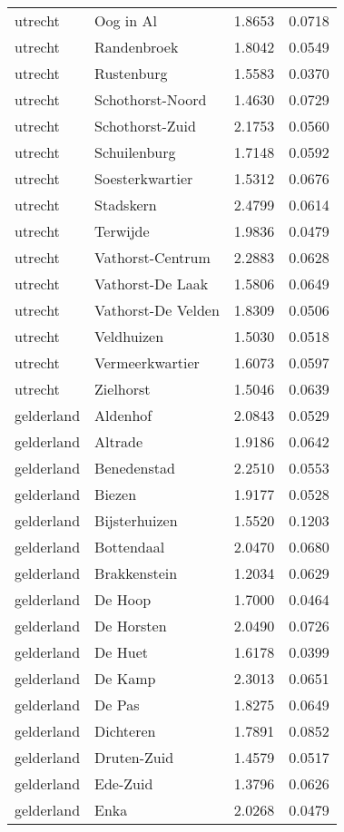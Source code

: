 \begin{longtable}{llcc}
utrecht & Oog in Al & 1.8653 & 0.0718 \\
utrecht & Randenbroek & 1.8042 & 0.0549 \\
utrecht & Rustenburg & 1.5583 & 0.0370 \\
utrecht & Schothorst-Noord & 1.4630 & 0.0729 \\
utrecht & Schothorst-Zuid & 2.1753 & 0.0560 \\
utrecht & Schuilenburg & 1.7148 & 0.0592 \\
utrecht & Soesterkwartier & 1.5312 & 0.0676 \\
utrecht & Stadskern & 2.4799 & 0.0614 \\
utrecht & Terwijde & 1.9836 & 0.0479 \\
utrecht & Vathorst-Centrum & 2.2883 & 0.0628 \\
utrecht & Vathorst-De Laak & 1.5806 & 0.0649 \\
utrecht & Vathorst-De Velden & 1.8309 & 0.0506 \\
utrecht & Veldhuizen & 1.5030 & 0.0518 \\
utrecht & Vermeerkwartier & 1.6073 & 0.0597 \\
utrecht & Zielhorst & 1.5046 & 0.0639 \\
gelderland & Aldenhof & 2.0843 & 0.0529 \\
gelderland & Altrade & 1.9186 & 0.0642 \\
gelderland & Benedenstad & 2.2510 & 0.0553 \\
gelderland & Biezen & 1.9177 & 0.0528 \\
gelderland & Bijsterhuizen & 1.5520 & 0.1203 \\
gelderland & Bottendaal & 2.0470 & 0.0680 \\
gelderland & Brakkenstein & 1.2034 & 0.0629 \\
gelderland & De Hoop & 1.7000 & 0.0464 \\
gelderland & De Horsten & 2.0490 & 0.0726 \\
gelderland & De Huet & 1.6178 & 0.0399 \\
gelderland & De Kamp & 2.3013 & 0.0651 \\
gelderland & De Pas & 1.8275 & 0.0649 \\
gelderland & Dichteren & 1.7891 & 0.0852 \\
gelderland & Druten-Zuid & 1.4579 & 0.0517 \\
gelderland & Ede-Zuid & 1.3796 & 0.0626 \\
gelderland & Enka & 2.0268 & 0.0479 \\

\end{longtable}
